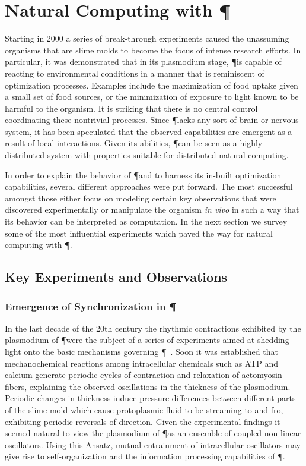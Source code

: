 
\section{Natural Computing with \P}\label{sec:natural_computing_physarum}

	Starting in 2000 a series of break-through experiments caused the unassuming organisms that are slime molds to become the focus of intense research efforts. In particular, it was demonstrated that in its plasmodium stage, \P is capable of reacting to environmental conditions in a manner that is reminiscent of optimization processes. Examples include the maximization of food uptake given a small set of food sources, or the minimization of exposure to light known to be harmful to the organism. It is striking that there is no central control coordinating these nontrivial processes. Since \P lacks any sort of brain or nervous system, it has been speculated that the observed capabilities are emergent as a result of local interactions. Given its abilities, \P can be seen as a highly distributed system with properties suitable for distributed natural computing.

	In order to explain the behavior of \P and to harness its in-built optimization capabilities, several different approaches were put forward. The most successful amongst those either focus on modeling certain key observations that were discovered experimentally or manipulate the organism \textit{in vivo} in such a way that its behavior can be interpreted as computation. In the next section we survey some of the most influential experiments which paved the way for natural computing with \P.

	\subsection{Key Experiments and Observations}

		\subsubsection{Emergence of Synchronization in \P }\label{sec:oscillator_experiment}
		
			In the last decade of the 20th century the rhythmic contractions exhibited by the plasmodium of \P were the subject of a series of experiments aimed at shedding light onto the basic mechanisms governing \P~\cite{MIYAKE1996341,NAKAGAKI1996261,TAKAHASHI1997105}. Soon it was established that mechanochemical reactions among intracellular chemicals such as ATP and calcium generate periodic cycles of contraction and relaxation of actomyosin fibers, explaining the observed oscillations in the thickness of the plasmodium. Periodic changes in thickness induce pressure differences between different parts of the slime mold which cause protoplasmic fluid to be streaming to and fro, exhibiting periodic reversals of direction. Given the experimental findings it seemed natural to view the plasmodium of \P as an ensemble of coupled non-linear oscillators. Using this Ansatz, mutual entrainment of intracellular oscillators may give rise to self-organization and the information processing capabilities of \P. 

